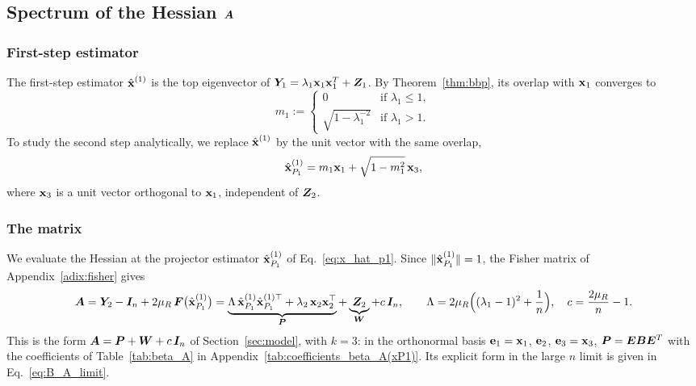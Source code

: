 \subsection{Spectrum of the Hessian $\bm{A}$}\label{sec:hessian_A}
\subsubsection{First-step estimator}
The first-step estimator $\hat{\boldsymbol{\mathbf{x}}}^{(1)}$ is the top eigenvector of $\bm{Y}_1 = \lambda_1 \boldsymbol{\mathbf{x}}_1 \boldsymbol{\mathbf{x}}_1 ^T + \bm{Z}_1$. By Theorem~\ref{thm:bbp}, its overlap with $\boldsymbol{\mathbf{x}}_1$ converges to
\begin{equation}
    m_1 := \begin{cases}
        0 & \text{if } \lambda_1 \le 1,\\[0.3em]
        \sqrt{1-\lambda_1^{-2}} & \text{if } \lambda_1 > 1.
    \end{cases}
    \label{eq:lambda_max_Y1}
\end{equation}
To study the second step analytically, we replace $\hat{\boldsymbol{\mathbf{x}}}^{(1)}$ by the unit vector with the same overlap,
\begin{equation}
    \hat{\boldsymbol{\mathbf{x}}}^{(1)}_{P_1} = m_1\boldsymbol{\mathbf{x}}_1 + \sqrt{1-m_1^2}\,\boldsymbol{\mathbf{x}}_3 ,
    \label{eq:x_hat_p1}
\end{equation}
where $\boldsymbol{\mathbf{x}}_3$ is a unit vector orthogonal to $\boldsymbol{\mathbf{x}}_1$, independent of $\bm{Z}_2$.

\subsubsection{The matrix}
We evaluate the Hessian at the projector estimator $\hat{\boldsymbol{\mathbf{x}}}^{(1)}_{P_1}$ of Eq.~\eqref{eq:x_hat_p1}. Since $ \|\hat{\boldsymbol{\mathbf{x}}}^{(1)}_{P_1} \| = 1$, the Fisher matrix of Appendix~\ref{adix:fisher} gives
\begin{equation}
    \bm{A} = \bm{Y}_2 - \bm{I}_n + 2\mu_R\,\bm{F}\big(\hat{\boldsymbol{\mathbf{x}}}^{(1)}_{P_1}\big)
    = \underbrace{\Lambda\,\hat{\boldsymbol{\mathbf{x}}}^{(1)}_{P_1}\hat{\boldsymbol{\mathbf{x}}}^{(1)\top}_{P_1} + \lambda_2\,\boldsymbol{\mathbf{x}}_2\boldsymbol{\mathbf{x}}_2^\top}_{\bm{P}}
    + \underbrace{\bm{Z}_2}_{\bm{W}} + c\,\bm{I}_n,
    \qquad
    \Lambda = 2\mu_R\Big((\lambda_1-1)^2 + \frac1n\Big), \quad c = \frac{2\mu_R}{n} - 1 .
    \label{eq:A_xP1}
\end{equation}
This is the form $\bm{A} = \bm{P} + \bm{W} + c\,\bm{I}_n$ of Section~\ref{sec:model}, with $k=3$: in the orthonormal basis $\boldsymbol{\mathbf{e}}_1 = \boldsymbol{\mathbf{x}}_1$, $\boldsymbol{\mathbf{e}}_2$, $\boldsymbol{\mathbf{e}}_3 = \boldsymbol{\mathbf{x}}_3$, $\bm{P} = \bm{E} \bm{B} \bm{E}^T$ with the coefficients of Table~\ref{tab:beta_A} in Appendix~\ref{tab:coefficients_beta_A(xP1)}. Its explicit form in the large $n$ limit is given in Eq.~\eqref{eq:B_A_limit}.

